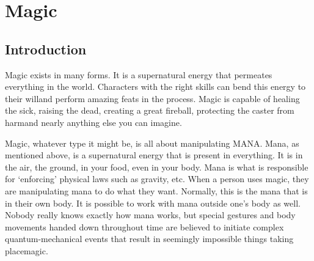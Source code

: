 \documentclass[twoside]{book}
\begin{document}
\begin{multicols}{2}
    \hspace{-2ex}
\vspace{1ex}


    \hspace{-2ex}
\vspace{1ex}


    \hspace{-2ex}
\vspace{1ex}


    \hspace{-2ex}
\vspace{1ex}


    \hspace{-2ex}
\vspace{1ex}


    \hspace{-2ex}
\vspace{1ex}


    
\end{multicols}
  
    

\chapter{Magic}
    
    

\section{Introduction}
    
    {  
      Magic exists in many forms. It is a supernatural
             energy that permeates everything in the world. Characters
             with the right skills can bend this energy to their
             willand perform amazing feats in the process. Magic
             is capable of healing the sick, raising the dead, creating a
             great fireball, protecting the caster from harmand
             nearly anything else you can imagine. 
    }
  
    {  
      Magic, whatever type it might be, is all about
             manipulating MANA. Mana, as mentioned above, is a
             supernatural energy that is present in everything. It is in
             the air, the ground, in your food, even in your body. Mana
             is what is responsible for `enforcing' physical
             laws such as gravity, etc. When a person uses magic, they
             are manipulating mana to do what they want. Normally, this
             is the mana that is in their own body. It is possible to
             work with mana outside one's body as well. Nobody
             really knows exactly how mana works, but special gestures
             and body movements handed down throughout time are believed
             to initiate complex quantum-mechanical events that result in
             seemingly impossible things taking placemagic.
             
    }
  
\end{document}
